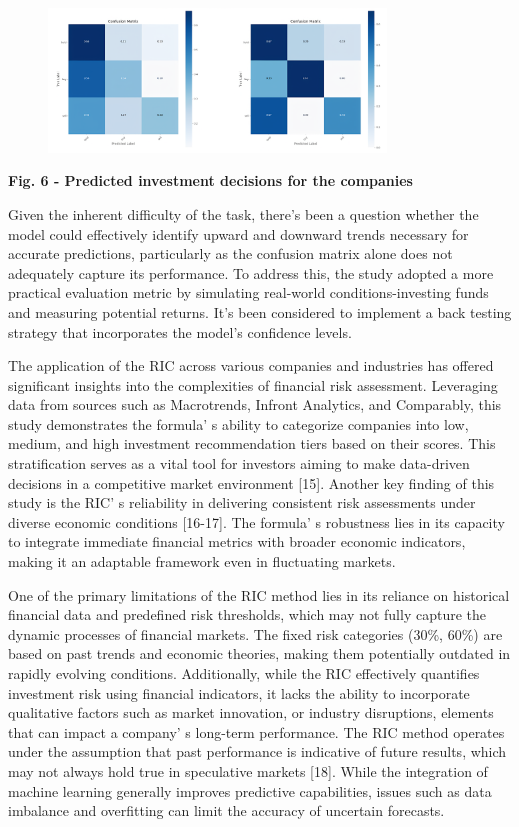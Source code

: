 {\begin{figure}[H]
	\centering
	\includegraphics[width=0.8\textwidth]{media/ict2/image14}
	\caption*{}
\end{figure}


{\bfseries Fig. 6 - Predicted investment decisions for the companies}

Given the inherent difficulty of the task, there's been a question
whether the model could effectively identify upward and downward trends
necessary for accurate predictions, particularly as the confusion matrix
alone does not adequately capture its performance. To address this, the
study adopted a more practical evaluation metric by simulating
real-world conditions-investing funds and measuring potential returns.
It's been considered to implement a back testing strategy that
incorporates the model's confidence levels.

The application of the RIC across various companies and industries has
offered significant insights into the complexities of financial risk
assessment. Leveraging data from sources such as Macrotrends, Infront
Analytics, and Comparably, this study demonstrates the
formula' s ability to categorize companies into low,
medium, and high investment recommendation tiers based on their scores.
This stratification serves as a vital tool for investors aiming to make
data-driven decisions in a competitive market environment {[}15{]}.
Another key finding of this study is the RIC' s
reliability in delivering consistent risk assessments under diverse
economic conditions {[}16-17{]}. The formula' s
robustness lies in its capacity to integrate immediate financial metrics
with broader economic indicators, making it an adaptable framework even
in fluctuating markets.

One of the primary limitations of the RIC method lies in its reliance on
historical financial data and predefined risk thresholds, which may not
fully capture the dynamic processes of financial markets. The fixed risk
categories (30\%, 60\%) are based on past trends and economic theories,
making them potentially outdated in rapidly evolving conditions.
Additionally, while the RIC effectively quantifies investment risk using
financial indicators, it lacks the ability to incorporate qualitative
factors such as market innovation, or industry disruptions, elements
that can impact a company' s long-term performance. The
RIC method operates under the assumption that past performance is
indicative of future results, which may not always hold true in
speculative markets {[}18{]}. While the integration of machine learning
generally improves predictive capabilities, issues such as data
imbalance and overfitting can limit the accuracy of uncertain forecasts.

}
